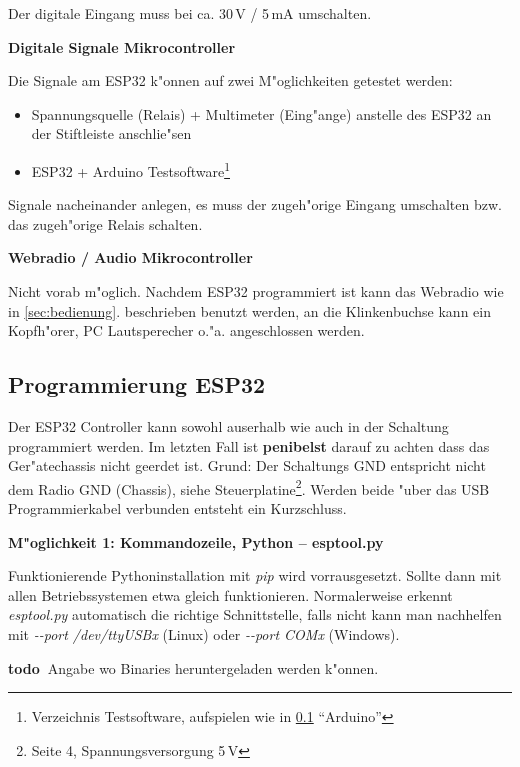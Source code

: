 \documentclass[ngerman,11pt,parskip=half] {scrartcl}
\newcommand {\todo} {\textbf{\color{red} todo\ }}
\begin{document}
Der digitale Eingang muss bei ca. 30\,V / 5\,mA umschalten.

\textbf{Digitale Signale Mikrocontroller}

Die Signale am ESP32 k"onnen auf zwei M"oglichkeiten getestet werden:
\begin{itemize}
\item Spannungsquelle (Relais) + Multimeter (Eing"ange) anstelle des ESP32 an der Stiftleiste anschlie"sen
\item ESP32 + Arduino Testsoftware\footnote{Verzeichnis Testsoftware, aufspielen wie in \ref{sec:aufbau:programmierung} "`Arduino"'}
\end{itemize}

Signale nacheinander anlegen, es muss der zugeh"orige Eingang umschalten bzw. das zugeh"orige Relais schalten.

\textbf{Webradio / Audio Mikrocontroller}

Nicht vorab m"oglich. Nachdem ESP32 programmiert ist kann das Webradio wie in \ref{sec:bedienung}. beschrieben benutzt werden, an die Klinkenbuchse kann ein Kopfh"orer, PC Lautsperecher o."a. angeschlossen werden.

\subsection{Programmierung ESP32} \label{sec:aufbau:programmierung}

Der ESP32 Controller kann sowohl auserhalb wie auch in der Schaltung programmiert werden. Im letzten Fall ist \textbf{\color{red} penibelst} darauf zu achten dass das Ger"atechassis nicht geerdet ist. Grund: Der Schaltungs GND entspricht nicht dem Radio GND (Chassis), siehe Steuerplatine\footnote{Seite 4, Spannungsversorgung 5\,V}. Werden beide "uber das USB Programmierkabel verbunden entsteht ein Kurzschluss.

\textbf{M"oglichkeit 1: Kommandozeile, Python -- esptool.py}


Funktionierende Pythoninstallation mit \emph{pip} wird vorrausgesetzt. Sollte dann mit allen Betriebssystemen etwa gleich funktionieren. Normalerweise erkennt \emph{esptool.py} automatisch die richtige Schnittstelle, falls nicht kann man nachhelfen mit \emph{-{}-port /dev/ttyUSBx} (Linux) oder \emph{-{}-port COMx} (Windows).

\todo Angabe wo Binaries heruntergeladen werden k"onnen.
\end{document}
